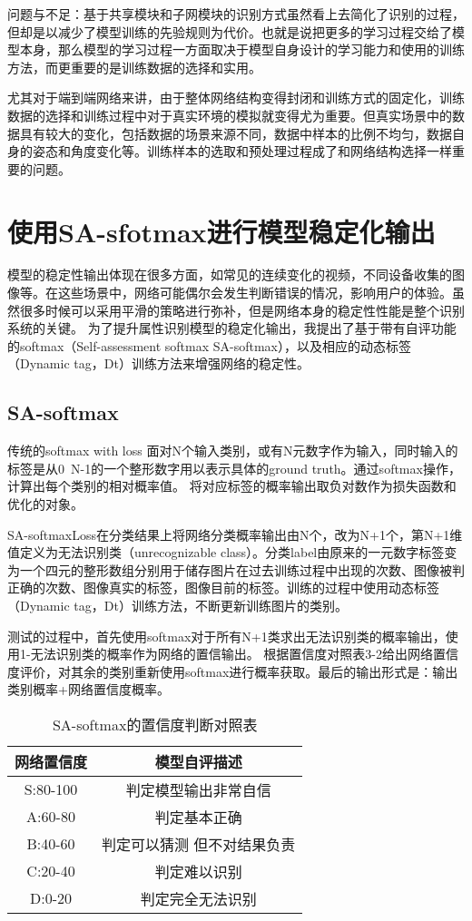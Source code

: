 问题与不足：基于共享模块和子网模块的识别方式虽然看上去简化了识别的过程，但却是以减少了模型训练的先验规则为代价。也就是说把更多的学习过程交给了模型本身，那么模型的学习过程一方面取决于模型自身设计的学习能力和使用的训练方法，而更重要的是训练数据的选择和实用。

尤其对于端到端网络来讲，由于整体网络结构变得封闭和训练方式的固定化，训练数据的选择和训练过程中对于真实环境的模拟就变得尤为重要。但真实场景中的数据具有较大的变化，包括数据的场景来源不同，数据中样本的比例不均匀，数据自身的姿态和角度变化等。训练样本的选取和预处理过程成了和网络结构选择一样重要的问题。
\section{使用SA-sfotmax进行模型稳定化输出}
模型的稳定性输出体现在很多方面，如常见的连续变化的视频，不同设备收集的图像等。在这些场景中，网络可能偶尔会发生判断错误的情况，影响用户的体验。虽然很多时候可以采用平滑的策略进行弥补，但是网络本身的稳定性性能是整个识别系统的关键。
为了提升属性识别模型的稳定化输出，我提出了基于带有自评功能的softmax（Self-assessment softmax SA-softmax），以及相应的动态标签（Dynamic tag，Dt）训练方法来增强网络的稳定性。
\subsection{SA-softmax}
传统的softmax with loss 面对N个输入类别，或有N元数字作为输入，同时输入的标签是从0~N-1的一个整形数字用以表示具体的ground truth。通过softmax操作，计算出每个类别的相对概率值。
将对应标签的概率输出取负对数作为损失函数和优化的对象。

SA-softmaxLoss在分类结果上将网络分类概率输出由N个，改为N+1个，第N+1维值定义为无法识别类（unrecognizable class）。分类label由原来的一元数字标签变为一个四元的整形数组分别用于储存图片在过去训练过程中出现的次数、图像被判正确的次数、图像真实的标签，图像目前的标签。训练的过程中使用动态标签（Dynamic tag，Dt）训练方法，不断更新训练图片的类别。

测试的过程中，首先使用softmax对于所有N+1类求出无法识别类的概率输出，使用1-无法识别类的概率作为网络的置信输出。
根据置信度对照表3-2给出网络置信度评价，对其余的类别重新使用softmax进行概率获取。最后的输出形式是：输出类别概率+网络置信度概率。
 \begin{table}[h]
  \centering
   \caption{SA-softmax的置信度判断对照表}
   \label{tab:req-pkg}
   \begin{tabular}{c|c}
     \toprule
     网络置信度 & 模型自评描述 \\
     \midrule
     S:80-100 & 判定模型输出非常自信				 	\\
     A:60-80  & 判定基本正确 				 		\\
     B:40-60  & 判定可以猜测 但不对结果负责  	 	\\
     C:20-40  & 判定难以识别    					\\
     D:0-20   & 判定完全无法识别				\\
     \bottomrule
   \end{tabular}
 \end{table}
